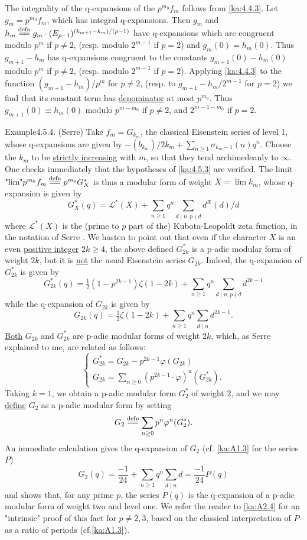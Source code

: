 \begin{kaproof}
The integrality of the q-expansions of the $p^{m_0}f_m$ follows from \eqref{ka:4.4.3}.
Let $g_m=p^{m_0}f_m$, which has integral q-expansions. Then $g_m$ and
$h_m\xlongequal{\text{defn}}g_m\cdot(E_{p-1})^{(k_{m+1}-k_m)/(p-1)}$ have
q-expansions which are congruent modulo $p^m$ if $p\neq 2$, (resp. modulo
$2^{m-1}$ if $p=2$) and $g_m(0)=h_m(0)$. Thus $g_{m+1}-h_m$ has q-expansions
congruent to the constants $g_{m+1}(0)-h_m(0)$ modulo $p^m$ if $p\neq 2$,
(resp. modulo $2^{m-1}$ if $p=2$). Applying \eqref{ka:4.4.3} to the function
$(g_{m+1}-h_m)/p^m$ for $p\neq 2$, (resp. to $g_{m+1}-h_m/2^{m-1}$ for $p=2$) we
find that its constant term has \uline{denominator} at most $p^{m_0}$. Thus
$g_{m+1}(0)\equiv h_m(0)$ modulo $p^{m-m_0}$ if $p\neq 2$, and $2^{m-1-m_0}$ if
$p=2$.
\end{kaproof}

\begin{kathm}{Example}{4.5.4.}
(Serre) Take $f_m=G_{k_m}$, the classical Eisenstein series of level 1, whose
q-expansions are given by $-(b_{k_m})/2k_m+\sum_{n\geq 1}\sigma_{k_m-1}(n)q^n$.
Choose the $k_m$ to be \uline{strictly increasing} with $m$, so that they tend
archimedeanly to $\infty$. One checks immediately that the hypotheses of \eqref{ka:4.5.3}
are verified. The limit $\text{"lim"}p^{m_0}f_m\xlongequal{\text{defn}}
p^{m_0}G_X^*$ is thus a modular form of weight $X=\lim k_m$, whose q-expansion
is given by
\[
G_X^*(q) = \mathcal{L}^*(X) + \sum_{n\geq 1}q^n\sum_{d\mid n,p\nmid d}d^{X}(d)/d
\]
where $\mathcal{L}^*(X)$ is the (prime to $p$ part of the) Kubota-Leopoldt zeta
function, in the notation of Serre \cite{serre-proceedings}. We hasten to point out that even if the
character $X$ is an even \uline{positive integer} $2k\geq 4$, the above defined
$G_{2k}^*$ is a p-adic modular form of weight $2k$, but it is \uline{not} the
usual Eisenstein series $G_{2k}$. Indeed, the q-expansion of $G_{2k}^*$ is given
by
\[
G_{2k}^*(q) = \tfrac{1}{2}(1-p^{2k-1})\zeta(1-2k) + \sum_{n\geq 1}q^n\sum_{d\mid n,p\nmid d}d^{2k-1}
\]
while the q-expansion of $G_{2k}$ is given by
\[
G_{2k}(q) = \tfrac{1}{2}\zeta(1-2k) + \sum_{n\geq 1}q^n\sum_{d\mid n}d^{2k-1} .
\]
\uline{Both} $G_{2k}$ and $G_{2k}^*$ are p-adic modular forms of weight $2k$,
which, as Serre explained to me, are related as follows:
\[
\begin{cases}
G_{2k}^* = G_{2k} - p^{2k-1}\varphi(G_{2k}) \\
G_{2k} = \sum_{n\geq 0}(p^{2k-1}\cdot\varphi)^n(G_{2k}^*) .
\end{cases}
\]
Taking $k=1$, we obtain a p-adic modular form $G_2^*$ of weight 2, and we may
\uline{define} $G_2$ as a p-adic modular form by setting
\[
G_2 \xlongequal{\text{defn}} \sum_{n\geq 0}p^n\varphi^n(G_2^*) .
\]
An immediate calculation gives the q-expansion of $G_2$ (cf. \ref{ka:A1.3} for the series
$P$)
\[
G_2(q) = \frac{-1}{24} + \sum_{n\geq 1}q^n\sum_{d\mid n}d = \frac{-1}{24}P(q)
\]
and shows that, for any prime $p$, the series $P(q)$ is the q-expansion of a
p-adic modular form of weight two and level one. We refer the reader to \ref{ka:A2.4} for
an "intrinsic" proof of this fact for $p\neq 2,3$, based on the classical
interpretation of $P$ as a ratio of periods (cf.\ref{ka:A1.3}).
\end{kathm}
